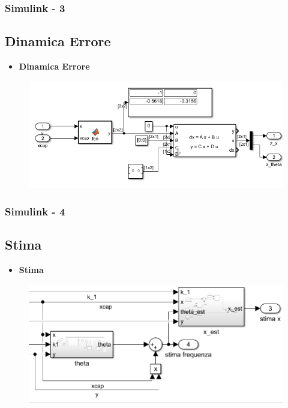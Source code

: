\documentclass{beamer}
\begin{document}
\begin{frame}
    \frametitle{Simulink - 3} %
    \subsection{Dinamica Errore}
    \begin{itemize}
        \item \textbf{Dinamica Errore}
    \end{itemize}
    \begin{minipage}[t]{0.9\textwidth}
        \begin{figure}
            \includegraphics[scale=0.4]{2022-05-15-17-53-20.png} %
        \end{figure}
    \end{minipage}
\end{frame}
\begin{frame}
    \frametitle{Simulink - 4} %
    \subsection{Stima}
    \begin{itemize}
        \item \textbf{Stima}
    \end{itemize}
    \begin{minipage}[t]{0.9\textwidth}
        \begin{figure}
            \includegraphics[scale=0.4]{2022-05-15-17-57-49.png} %
        \end{figure}
    \end{minipage}
\end{frame}
\end{document}
